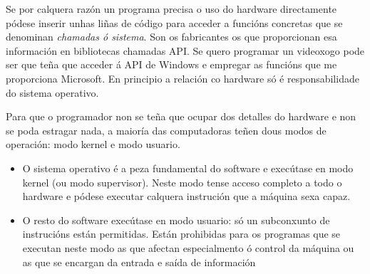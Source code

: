 Se por calquera razón un programa precisa o uso do hardware directamente pódese inserir unhas liñas de código para acceder a funcións concretas que se denominan  \textit{chamadas ó sistema}. Son os fabricantes os que proporcionan esa información en bibliotecas chamadas API. Se quero programar un videoxogo pode ser que teña que acceder á API de Windows e empregar as funcións que me proporciona Microsoft. En principio a relación co hardware só é responsabilidade do sistema operativo.

Para que o programador non se teña que ocupar dos detalles do hardware e non se poda estragar nada,  a maioría das computadoras teñen dous modos de operación: modo kernel e modo usuario.


\begin{itemize}
\item 
O sistema operativo é a peza fundamental do software e  execútase en modo kernel (ou modo supervisor). Neste modo tense acceso completo a todo o hardware e pódese executar calquera instrución que a máquina sexa capaz.
\item O resto do software  execútase en modo usuario: só un subconxunto de instrucións están permitidas. Están prohibidas para os programas que se executan neste modo as que afectan especialmento ó control da máquina ou as que se encargan da entrada e saída de información 
\end{itemize}

